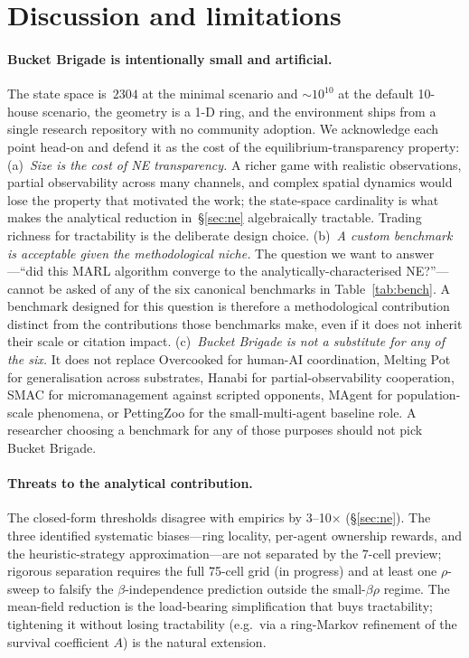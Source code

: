 \documentclass{anvil-paper}
\begin{document}
\section{Discussion and limitations}
\label{sec:discussion}

\paragraph{Bucket Brigade is intentionally small and artificial.}
The state space is~$2304$ at the minimal scenario and $\sim\!10^{10}$ at the
default 10-house scenario, the geometry is a 1-D ring, and the environment
ships from a single research repository with no community adoption. We
acknowledge each point head-on and defend it as the cost of the
equilibrium-transparency property:
(a)~\emph{Size is the cost of NE transparency.} A richer game with realistic
observations, partial observability across many channels, and complex spatial
dynamics would lose the property that motivated the work; the state-space
cardinality is what makes the analytical reduction in~\S\ref{sec:ne}
algebraically tractable. Trading richness for tractability is the deliberate
design choice.
(b)~\emph{A custom benchmark is acceptable given the methodological niche.}
The question we want to answer---``did this MARL algorithm converge to the
analytically-characterised NE?''---cannot be asked of any of the six
canonical benchmarks in Table~\ref{tab:bench}. A benchmark designed for this
question is therefore a methodological contribution distinct from the
contributions those benchmarks make, even if it does not inherit their scale
or citation impact.
(c)~\emph{Bucket Brigade is not a substitute for any of the six.} It does
not replace Overcooked for human-AI coordination, Melting Pot for
generalisation across substrates, Hanabi for partial-observability
cooperation, SMAC for micromanagement against scripted opponents, MAgent
for population-scale phenomena, or PettingZoo for the small-multi-agent
baseline role. A researcher choosing a benchmark for any of those purposes
should not pick Bucket Brigade.

\paragraph{Threats to the analytical contribution.}
The closed-form thresholds disagree with empirics by 3--10$\times$
(\S\ref{sec:ne}). The three identified systematic biases---ring locality,
per-agent ownership rewards, and the heuristic-strategy approximation---are
not separated by the 7-cell preview; rigorous separation requires the
full 75-cell grid (in progress) and at least one $\rho$-sweep to falsify the
$\beta$-independence prediction outside the small-$\beta\rho$ regime. The
mean-field reduction is the load-bearing simplification that buys
tractability; tightening it without losing tractability (e.g.\ via a
ring-Markov refinement of the survival coefficient $A$) is the natural
extension.
\end{document}
